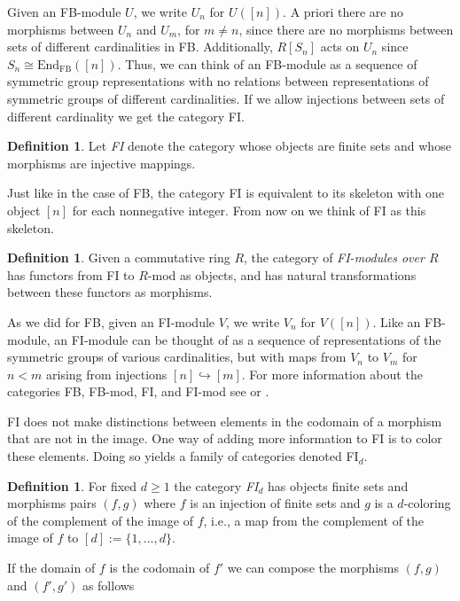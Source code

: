 \documentclass[12py]{amsart}%
\theoremstyle{definition}\newtheorem{definition}[thm]{Definition}
\theoremstyle{definition}
\newtheorem{defn}[thm]{Definition}
\begin{document}
Given an FB-module $U$, we write $U_{n}$ for $U([n])$. A priori there are no morphisms between $U_{n}$ and $U_{m}$, for $m\neq n$, since there are no morphisms between sets of different cardinalities in FB. Additionally, $R[S_{n}]$ acts on $U_{n}$ since $S_{n}\cong \text{End}_{\text{FB}}([n])$. Thus, we can think of an FB-module as a sequence of symmetric group representations with no relations between representations of symmetric groups of different cardinalities. If we allow injections between sets of different cardinality we get the category FI.

\begin{defn}
Let \emph{FI} denote the category whose objects are finite sets and whose morphisms are injective mappings.
\end{defn}

Just like in the case of FB, the category FI is equivalent to its skeleton with one object $[n]$ for each nonnegative integer. From now on we think of FI as this skeleton.

\begin{defn}
Given a commutative ring $R$, the category of \emph{FI-modules over $R$} has functors from FI to $R$-mod as objects, and has natural transformations between these functors as morphisms.
\end{defn}

As we did for FB, given an FI-module $V$, we write $V_{n}$ for $V([n])$. Like an FB-module, an FI-module can be thought of as a sequence of representations of the symmetric groups of various cardinalities, but with maps from $V_{n}$ to $V_{m}$ for $n<m$ arising from injections $[n]\hookrightarrow [m]$. For more information about the categories FB, FB-mod, FI, and FI-mod see \cite{church2015fi} or \cite{wilson2018introduction}.

FI does not make distinctions between elements in the codomain of a morphism that are not in the image. One way of adding more information to FI is to color these elements. Doing so yields a family of categories denoted FI$_{d}$.

\begin{defn}
For fixed $d\ge 1$ the category \emph{FI$_{d}$} has objects finite sets and morphisms pairs $(f,g)$ where $f$ is an injection of finite sets and $g$ is a $d$-coloring of the complement of the image of $f$, i.e., a map from the complement of the image of $f$ to $[d]:=\{1,\dots, d\}$.
\end{defn}

If the domain of $f$ is the codomain of $f'$ we can compose the morphisms $(f,g)$ and $(f', g')$ as follows
\end{document}
